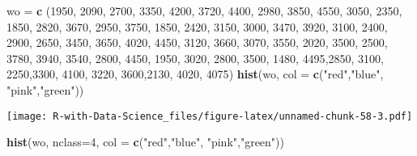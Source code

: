 \documentclass[
]{article}
\newenvironment{Shaded}{\begin{snugshade}}{\end{snugshade}}
\newcommand{\AttributeTok}[1]{\textcolor[rgb]{0.13,0.29,0.53}{#1}}
\newcommand{\DecValTok}[1]{\textcolor[rgb]{0.00,0.00,0.81}{#1}}
\newcommand{\FunctionTok}[1]{\textcolor[rgb]{0.13,0.29,0.53}{\textbf{#1}}}
\newcommand{\NormalTok}[1]{#1}
\newcommand{\OtherTok}[1]{\textcolor[rgb]{0.56,0.35,0.01}{#1}}
\newcommand{\StringTok}[1]{\textcolor[rgb]{0.31,0.60,0.02}{#1}}
\begin{document}
\begin{Shaded}
\begin{Highlighting}[]
\NormalTok{wo }\OtherTok{=} \FunctionTok{c}\NormalTok{ (}\DecValTok{1950}\NormalTok{, }\DecValTok{2090}\NormalTok{, }\DecValTok{2700}\NormalTok{, }\DecValTok{3350}\NormalTok{, }\DecValTok{4200}\NormalTok{, }\DecValTok{3720}\NormalTok{, }\DecValTok{4400}\NormalTok{, }\DecValTok{2980}\NormalTok{, }\DecValTok{3850}\NormalTok{, }\DecValTok{4550}\NormalTok{, }\DecValTok{3050}\NormalTok{, }\DecValTok{2350}\NormalTok{, }\DecValTok{1850}\NormalTok{, }\DecValTok{2820}\NormalTok{, }\DecValTok{3670}\NormalTok{, }\DecValTok{2950}\NormalTok{, }\DecValTok{3750}\NormalTok{, }\DecValTok{1850}\NormalTok{, }\DecValTok{2420}\NormalTok{, }\DecValTok{3150}\NormalTok{, }\DecValTok{3000}\NormalTok{, }\DecValTok{3470}\NormalTok{, }\DecValTok{3920}\NormalTok{, }\DecValTok{3100}\NormalTok{, }\DecValTok{2400}\NormalTok{, }\DecValTok{2900}\NormalTok{, }\DecValTok{2650}\NormalTok{, }\DecValTok{3450}\NormalTok{, }\DecValTok{3650}\NormalTok{, }\DecValTok{4020}\NormalTok{, }\DecValTok{4450}\NormalTok{, }\DecValTok{3120}\NormalTok{, }\DecValTok{3660}\NormalTok{, }\DecValTok{3070}\NormalTok{, }\DecValTok{3550}\NormalTok{, }\DecValTok{2020}\NormalTok{, }\DecValTok{3500}\NormalTok{, }\DecValTok{2500}\NormalTok{, }\DecValTok{3780}\NormalTok{, }\DecValTok{3940}\NormalTok{, }\DecValTok{3540}\NormalTok{, }\DecValTok{2800}\NormalTok{, }\DecValTok{4450}\NormalTok{, }\DecValTok{1950}\NormalTok{, }\DecValTok{3020}\NormalTok{, }\DecValTok{2800}\NormalTok{, }\DecValTok{3500}\NormalTok{, }\DecValTok{1480}\NormalTok{, }\DecValTok{4495}\NormalTok{,}\DecValTok{2850}\NormalTok{, }\DecValTok{3100}\NormalTok{, }\DecValTok{2250}\NormalTok{,}\DecValTok{3300}\NormalTok{, }\DecValTok{4100}\NormalTok{, }\DecValTok{3220}\NormalTok{, }\DecValTok{3600}\NormalTok{,}\DecValTok{2130}\NormalTok{, }\DecValTok{4020}\NormalTok{, }\DecValTok{4075}\NormalTok{)}
\FunctionTok{hist}\NormalTok{(wo, }\AttributeTok{col =} \FunctionTok{c}\NormalTok{(}\StringTok{"red"}\NormalTok{,}\StringTok{"blue"}\NormalTok{, }\StringTok{"pink"}\NormalTok{,}\StringTok{"green"}\NormalTok{))}
\end{Highlighting}
\end{Shaded}

\texttt{[image: R-with-Data-Science\_files/figure-latex/unnamed-chunk-58-3.pdf]}

\begin{Shaded}
\begin{Highlighting}[]
\FunctionTok{hist}\NormalTok{(wo, }\AttributeTok{nclass=}\DecValTok{4}\NormalTok{, }\AttributeTok{col =} \FunctionTok{c}\NormalTok{(}\StringTok{"red"}\NormalTok{,}\StringTok{"blue"}\NormalTok{, }\StringTok{"pink"}\NormalTok{,}\StringTok{"green"}\NormalTok{))}
\end{Highlighting}
\end{Shaded}
\end{document}
